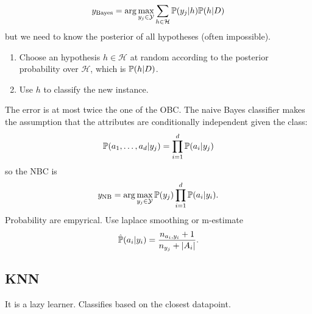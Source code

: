\documentclass[a4paper,9pt]{extarticle}
\begin{document}
\begin{multicols*}{2}
\begin{equation*}
	y_{\mathrm{Bayes}}=\arg\max_{y_{j}\in\mathcal{Y}}\sum_{h\in\mathcal{H}}\mathbb{P}(y_{j}|h)\mathbb{P}(h|D)
\end{equation*}
but we need to know the posterior of all hypotheses (often impossible).
\begin{riquadro}
	\begin{enumerate}
		\item Choose an hypothesis $h\in\mathcal{H}$ at random according to the posterior probability over $\mathcal{H}$, which is $\mathbb{P}(h|D)$.
		\item Use $h$ to classify the new instance.
	\end{enumerate}
\end{riquadro}
The error is at most twice the one of the OBC.
The naive Bayes classifier makes the assumption that the attributes are conditionally independent given the class:
\begin{equation*}
	\mathbb{P}(a_{1},\ldots,a_{d}|y_{j})=\prod_{i=1}^{d}\mathbb{P}(a_{i}|y_{j})
\end{equation*}
so the NBC is
\begin{equation*}
	y_{\mathrm{NB}}=\arg\max_{y_{j}\in\mathcal{Y}}\mathbb{P}(y_{j})\prod_{i=1}^{d}\mathbb{P}(a_{i}|y_{i}).
\end{equation*}
Probability are empyrical. Use laplace smoothing or m-estimate
\begin{equation*}
	\hat{\mathbb{P}}(a_{i}|y_{i})=\frac{n_{a_{i},y_{i}}+1}{n_{y_{j}}+|A_{i}|}.
\end{equation*}
\subsection{KNN}
It is a lazy learner. Classifies based on the closest datapoint.

\end{multicols*}
\end{document}
